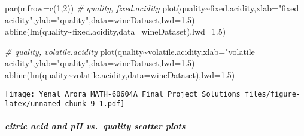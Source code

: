 \documentclass[
]{article}
\newenvironment{Shaded}{\begin{snugshade}}{\end{snugshade}}
\newcommand{\AttributeTok}[1]{\textcolor[rgb]{0.77,0.63,0.00}{#1}}
\newcommand{\CommentTok}[1]{\textcolor[rgb]{0.56,0.35,0.01}{\textit{#1}}}
\newcommand{\DecValTok}[1]{\textcolor[rgb]{0.00,0.00,0.81}{#1}}
\newcommand{\FloatTok}[1]{\textcolor[rgb]{0.00,0.00,0.81}{#1}}
\newcommand{\FunctionTok}[1]{\textcolor[rgb]{0.00,0.00,0.00}{#1}}
\newcommand{\NormalTok}[1]{#1}
\newcommand{\SpecialCharTok}[1]{\textcolor[rgb]{0.00,0.00,0.00}{#1}}
\newcommand{\StringTok}[1]{\textcolor[rgb]{0.31,0.60,0.02}{#1}}
\begin{document}
\begin{Shaded}
\begin{Highlighting}[]
\FunctionTok{par}\NormalTok{(}\AttributeTok{mfrow=}\FunctionTok{c}\NormalTok{(}\DecValTok{1}\NormalTok{,}\DecValTok{2}\NormalTok{))}
\CommentTok{\# quality, fixed.acidity}
\FunctionTok{plot}\NormalTok{(quality}\SpecialCharTok{\textasciitilde{}}\NormalTok{fixed.acidity,}\AttributeTok{xlab=}\StringTok{"fixed acidity"}\NormalTok{,}\AttributeTok{ylab=}\StringTok{"quality"}\NormalTok{,}\AttributeTok{data=}\NormalTok{wineDataset,}\AttributeTok{lwd=}\FloatTok{1.5}\NormalTok{)}
\FunctionTok{abline}\NormalTok{(}\FunctionTok{lm}\NormalTok{(quality}\SpecialCharTok{\textasciitilde{}}\NormalTok{fixed.acidity,}\AttributeTok{data=}\NormalTok{wineDataset),}\AttributeTok{lwd=}\FloatTok{1.5}\NormalTok{)}

\CommentTok{\# quality, volatile.acidity}
\FunctionTok{plot}\NormalTok{(quality}\SpecialCharTok{\textasciitilde{}}\NormalTok{volatile.acidity,}\AttributeTok{xlab=}\StringTok{"volatile acidity"}\NormalTok{,}\AttributeTok{ylab=}\StringTok{"quality"}\NormalTok{,}\AttributeTok{data=}\NormalTok{wineDataset,}\AttributeTok{lwd=}\FloatTok{1.5}\NormalTok{)}
\FunctionTok{abline}\NormalTok{(}\FunctionTok{lm}\NormalTok{(quality}\SpecialCharTok{\textasciitilde{}}\NormalTok{volatile.acidity,}\AttributeTok{data=}\NormalTok{wineDataset),}\AttributeTok{lwd=}\FloatTok{1.5}\NormalTok{)}
\end{Highlighting}
\end{Shaded}

\texttt{[image: Yenal\_Arora\_MATH-60604A\_Final\_Project\_Solutions\_files/figure-latex/unnamed-chunk-9-1.pdf]}

\hypertarget{citric-acid-and-ph-vs.-quality-scatter-plots}{%
\subparagraph{citric acid and pH vs.~quality scatter
plots}\label{citric-acid-and-ph-vs.-quality-scatter-plots}}
\end{document}
